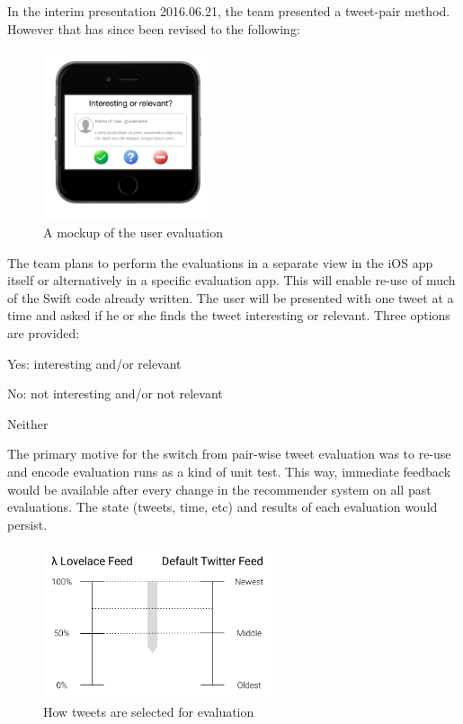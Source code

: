 \documentclass{article}
\begin{document}
\noindent In the interim presentation 2016.06.21, the team presented a tweet-pair method. However that has since been revised to the following:

\begin{figure}[H]
    \centering
    \includegraphics[width=0.45\textwidth]{tweet_evaluation}  
    \caption{A mockup of the user evaluation}
\end{figure}

\noindent The team plans to perform the evaluations in a separate view in the iOS app itself or alternatively in a specific evaluation app. This will enable re-use of much of the Swift code already written. The user will be presented with one tweet at a time and asked if he or she finds the tweet interesting or relevant. Three options are provided:

\begin{itemize*}
    \item Yes: interesting and/or relevant
    \item No: not interesting and/or not relevant
    \item Neither
\end{itemize*}

\noindent The primary motive for the switch from pair-wise tweet evaluation was to re-use and encode evaluation runs as a kind of unit test. This way, immediate feedback would be available after every change in the recommender system on all past evaluations. The state (tweets, time, etc) and results of each evaluation would persist.

\begin{figure}[H]
    \centering
    \includegraphics[width=0.6\textwidth]{evaluations_1}  
    \caption{How tweets are selected for evaluation}
\end{figure}
\end{document}
